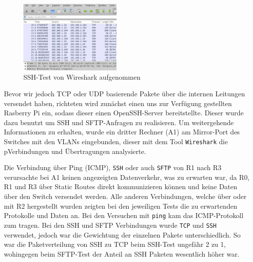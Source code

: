 \documentclass[11pt,a4paper]{article}
\begin{document}
\par 
\begin{figure}
\centering
\includegraphics[width = 0.45\textwidth]{wireshark2.jpeg}
\caption{\footnotesize{SSH-Test von Wireshark aufgenommen}}
\end{figure}
Bevor wir jedoch TCP oder UDP basierende Pakete über die internen
Leitungen versendet haben, richteten wird zunächst einen uns zur
Verfügung gestellten Rasberry Pi ein, sodass dieser einen
OpenSSH-Server bereitstellte. Dieser wurde dazu benutzt um SSH und
SFTP-Anfragen zu realisieren. Um weitergehende Informationen zu
erhalten, wurde ein dritter Rechner (A1) am Mirror-Port des Switches
mit den VLANs eingebunden, dieser mit dem Tool \texttt{Wireshark} die
pVerbindungen und Übertragungen analysierte.
\par
Die Verbindung über Ping (ICMP), \texttt{SSH} oder auch \texttt{SFTP}
von R1 nach R3 verursachte bei A1 keinen angezeigten Datenverkehr, was
zu erwarten war, da R0, R1 und R3 über Static Routes direkt
kommunizieren können und keine Daten über den Switch versendet werden.
Alle anderen Verbindungen, welche über oder mit R2 hergestellt wurden
zeigten bei den jeweiligen Tests die zu erwartenden Protokolle und
Daten an. Bei den Versuchen mit \texttt{ping} kam das ICMP-Protokoll
zum tragen. Bei den SSH und SFTP Verbindungen wurde \texttt{TCP} und
\texttt{SSH} verwendet, jedoch war die Gewichtung der einzelnen Pakete
unterschiedlich. So war die Paketverteilung von SSH zu TCP beim
SSH-Test ungefähr 2 zu 1, wohingegen beim SFTP-Test der Anteil an SSH
Paketen wesentlich höher war.
\end{document}
